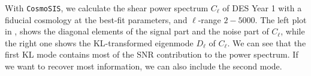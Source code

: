 \documentclass[twocolumn]{\docclass}
\def\bea{\begin{eqnarray}}
\def\eea{\end{eqnarray}}
\def\svs{\nonumber\\}
\begin{document}
	
		With  {\tt CosmoSIS}, we calculate the shear power spectrum $C_{\ell}$ of DES Year 1 with a fiducial cosmology at the best-fit parameters, and $\ell$-range $2-5000$. The left plot in , shows the diagonal elements of the signal part and the noise part of $C_{\ell}$, while the right one shows the KL-transformed eigenmode $D_{\ell}$ of $C_{\ell}$. We can see that the first KL mode contains most of the SNR contribution to the power spectrum. If we want to recover most information, we can also include the second mode.
	
\end{document}
